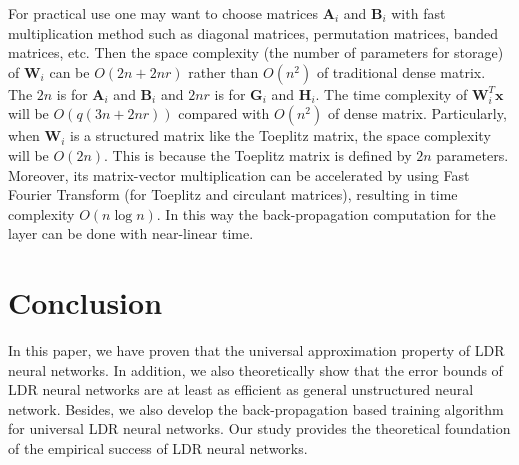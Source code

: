 \documentclass{article}
\begin{document}
For practical use one may want to choose matrices $\mathbf{A}_i$ and $\mathbf{B}_i$ with fast multiplication method such as diagonal matrices, permutation matrices, banded matrices, etc. Then the space complexity (the number of parameters for storage) of $\mathbf{W}_i$ can be $O(2n+2nr)$ rather than $O(n^2)$ of traditional dense matrix. The $2n$ is for $\mathbf{A}_i$ and $\mathbf{B}_i$ and $2nr$ is for $\mathbf{G}_i$ and $\mathbf{H}_i$. The time complexity of $\mathbf{W}_i^T\mathbf{x}$ will be $O(q(3n+2nr))$ compared with $O(n^2)$ of dense matrix.  Particularly, when $\mathbf{W}_i$ is a structured matrix like the Toeplitz matrix, the space complexity will be $O(2n)$. This is because the Toeplitz matrix is defined by $2n$ parameters. Moreover, its matrix-vector multiplication can be accelerated by using Fast Fourier Transform (for Toeplitz and circulant matrices), resulting in time complexity $O(n\log n)$. In this way the back-propagation computation for the layer can be done with near-linear time.

\section{Conclusion}
\label{scon}
In this paper, we have proven that the universal approximation property of LDR neural networks. In addition, we also theoretically show that the error bounds of LDR neural networks are at least as efficient as general unstructured neural network. Besides, we also develop the back-propagation based training algorithm for universal LDR neural networks. Our study provides the theoretical foundation of the empirical success of LDR neural networks.





\end{document}
